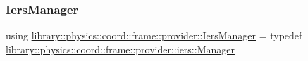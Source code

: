 \subsubsection{\texorpdfstring{Iers\+Manager}{IersManager}}
{\footnotesize\ttfamily using \hyperlink{namespacelibrary_1_1physics_1_1coord_1_1frame_1_1provider_a15b849528adaef87163ae1ba9daf12ee}{library\+::physics\+::coord\+::frame\+::provider\+::\+Iers\+Manager} = typedef \hyperlink{classlibrary_1_1physics_1_1coord_1_1frame_1_1provider_1_1iers_1_1_manager}{library\+::physics\+::coord\+::frame\+::provider\+::iers\+::\+Manager}}

